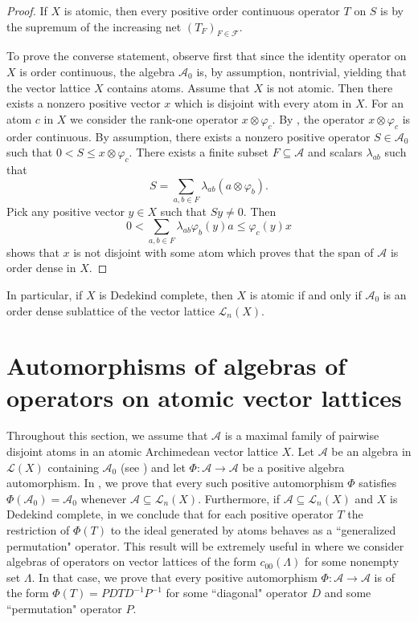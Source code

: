 \documentclass[12pt,reqno]{amsart}
\theoremstyle{plain}
\theoremstyle{definition}
\begin{document}
\begin{proof}
    If $X$ is atomic, then every positive order continuous operator $T$ on $S$ is by  the supremum of the increasing net $(T_F)_{F\in \mathcal F}$. 
    
    To prove the converse statement,  observe first that since the identity operator on $X$ is order continuous, the algebra $\mathscr A_0$ is, by assumption, nontrivial, yielding that the vector lattice $X$ contains atoms. Assume that $X$ is not atomic.    
    Then there exists a nonzero positive vector $x$ which is disjoint with every atom in $X$.  For an atom $c$ in $X$ we consider the rank-one operator $x\otimes \varphi_c$. By , the operator $x\otimes \varphi_c$ is order continuous. By assumption, there exists a nonzero positive operator $S\in \mathscr A_0$ such that  $0<S\leq x\otimes \varphi_c$. There exists a finite subset $F\subseteq \mathcal A$ and scalars $\lambda_{ab}$ such that 
    $$S=\sum_{a,b\in F}\lambda_{ab}(a\otimes \varphi_b).$$  Pick any positive vector  $y\in X$ such that $Sy\neq 0$. Then 
    $$0< \sum_{a,b\in F}\lambda_{ab}\varphi_b(y)a\leq \varphi_c(y)x$$ shows that $x$ is not disjoint with some atom which proves that the span of $\mathcal A$ is order dense in $X$.  
\end{proof}

In particular, if $X$ is Dedekind complete, then $X$ is atomic if and only if $\mathscr A_0$ is an order dense sublattice of the vector lattice $\mathscr L_n(X)$.

\section{Automorphisms of algebras of operators on atomic vector lattices}\label{automorphisms of algebras}
 
Throughout this section, we assume that $\mathcal A$ is a maximal family of pairwise disjoint atoms in an atomic Archimedean vector lattice $X$. Let $\mathscr A$ be an algebra in $\mathscr L(X)$ containing $\mathscr A_0$ (see ) and let $\Phi\colon \mathscr A\to \mathscr A$ be a positive algebra automorphism.  In , we prove that every such positive automorphism $\Phi$ satisfies $\Phi(\mathscr A_0)=\mathscr A_0$ whenever $\mathscr A\subseteq \mathscr L_n(X)$. Furthermore, if $\mathscr A\subseteq \mathscr L_n(X)$ and $X$ is Dedekind complete, in  we conclude that for each positive operator $T$ the restriction of $\Phi(T)$ to the ideal  generated by atoms behaves as a ``generalized permutation" operator. This result will be extremely useful in  where we consider algebras of operators on vector lattices of the form $c_{00}(\Lambda)$ for some nonempty set $\Lambda$. In that case, we prove that every positive automorphism $\Phi\colon \mathscr A\to \mathscr A$ is of the form 
$\Phi(T)=PDTD^{-1}P^{-1}$ for some ``diagonal" operator $D$ and some ``permutation" operator $P$. 
\end{document}
